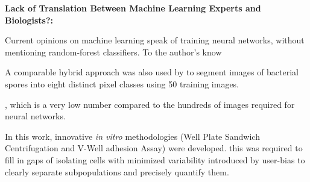 \textbf{Lack of Translation Between Machine Learning Experts and Biologists?:}

Current opinions on machine learning speak of training neural networks, without mentioning
random-forest classifiers.
To the author's know


A comparable hybrid approach was also used by \citet{qamarHybridCNNRandomForest2023}
to segment images of bacterial spores
into eight distinct pixel classes using 50 training images.

, which is a very low number compared to the
hundreds of images required for neural networks.





%
\label{sec:discussion_conclusion_microscopy}%




%
\label{sec:discussion_novel_methods}%

In this work, innovative \textit{in vitro} methodologies (Well Plate Sandwich
Centrifugation and V-Well adhesion Assay) were developed. this was required to
fill in gaps of isolating cells with minimized variability introduced by
user-bias to clearly separate subpopulations and precisely quantify them.


